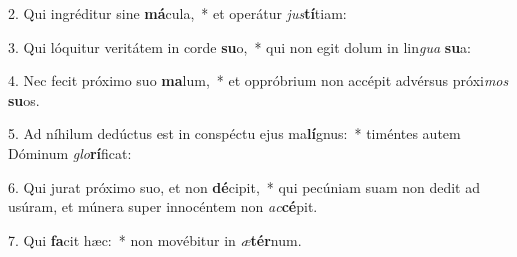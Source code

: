 2. Qui ingréditur sine \textbf{má}cula,~*  et operátur \textit{jus}\textbf{tí}tiam:\

3. Qui lóquitur veritátem in corde \textbf{su}o,~*  qui non egit dolum in lin\textit{gua} \textbf{su}a:\

4. Nec fecit próximo suo \textbf{ma}lum,~*  et oppróbrium non accépit advérsus próxi\textit{mos} \textbf{su}os.\

5. Ad níhilum dedúctus est in conspéctu ejus ma\textbf{lí}gnus:~*  timéntes autem Dóminum \textit{glo}\textbf{rí}ficat:\

6. Qui jurat próximo suo, et non \textbf{dé}cipit,~*  qui pecúniam suam non dedit ad usúram, et múnera super innocéntem non \textit{ac}\textbf{cé}pit.\

7. Qui \textbf{fa}cit hæc:~*  non movébitur in \textit{æ}\textbf{tér}num.\

